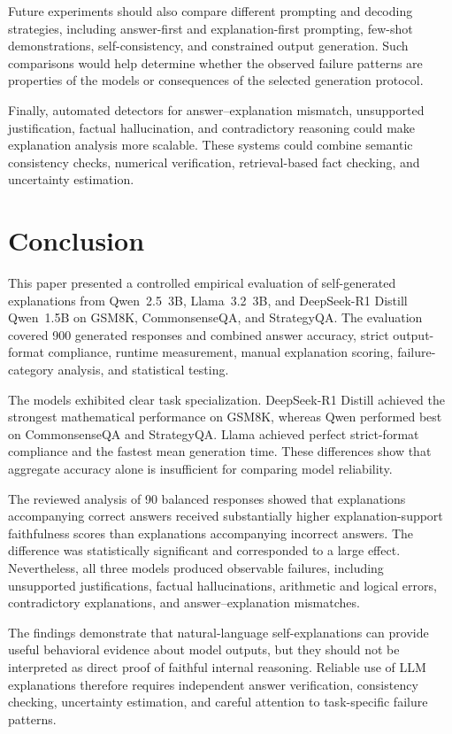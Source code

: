 \documentclass{article}
\begin{document}
Future experiments should also compare different prompting and
decoding strategies, including answer-first and explanation-first
prompting, few-shot demonstrations, self-consistency, and constrained
output generation. Such comparisons would help determine whether the
observed failure patterns are properties of the models or consequences
of the selected generation protocol.

Finally, automated detectors for answer--explanation mismatch,
unsupported justification, factual hallucination, and contradictory
reasoning could make explanation analysis more scalable. These systems
could combine semantic consistency checks, numerical verification,
retrieval-based fact checking, and uncertainty estimation.

\section{Conclusion}

This paper presented a controlled empirical evaluation of
self-generated explanations from Qwen~2.5~3B, Llama~3.2~3B, and
DeepSeek-R1 Distill Qwen~1.5B on GSM8K, CommonsenseQA, and
StrategyQA. The evaluation covered 900 generated responses and combined
answer accuracy, strict output-format compliance, runtime measurement,
manual explanation scoring, failure-category analysis, and statistical
testing.

The models exhibited clear task specialization. DeepSeek-R1 Distill
achieved the strongest mathematical performance on GSM8K, whereas
Qwen performed best on CommonsenseQA and StrategyQA. Llama achieved
perfect strict-format compliance and the fastest mean generation time.
These differences show that aggregate accuracy alone is insufficient
for comparing model reliability.

The reviewed analysis of 90 balanced responses showed that explanations
accompanying correct answers received substantially higher
explanation-support faithfulness scores than explanations accompanying
incorrect answers. The difference was statistically significant and
corresponded to a large effect. Nevertheless, all three models produced
observable failures, including unsupported justifications, factual
hallucinations, arithmetic and logical errors, contradictory
explanations, and answer--explanation mismatches.

The findings demonstrate that natural-language self-explanations can
provide useful behavioral evidence about model outputs, but they should
not be interpreted as direct proof of faithful internal reasoning.
Reliable use of LLM explanations therefore requires independent answer
verification, consistency checking, uncertainty estimation, and careful
attention to task-specific failure patterns.
\end{document}
